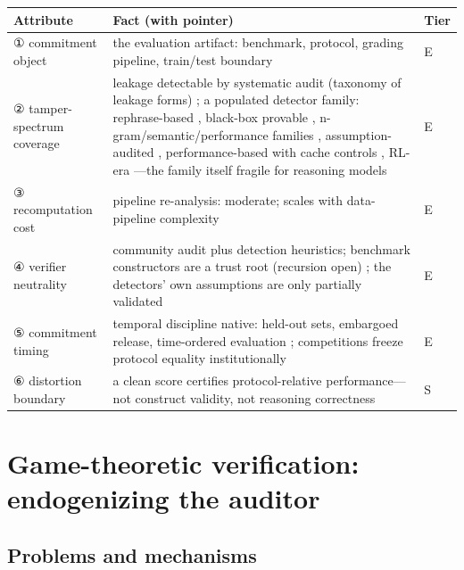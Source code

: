 \documentclass[11pt,a4paper]{article}
\begin{document}
\begin{table}[htbp]
\centering
\footnotesize
\setlength{\tabcolsep}{3.5pt}
\renewcommand{\arraystretch}{1.18}
\begin{tabularx}{0.985\textwidth}{>{\raggedright\arraybackslash}p{} >{\raggedright\arraybackslash}X >{\raggedright\arraybackslash}p{}}
\toprule
\textbf{Attribute} & \textbf{Fact (with pointer)} & \textbf{Tier} \\
\midrule
① commitment object & the evaluation artifact: benchmark, protocol, grading pipeline, train\slash test boundary \cite{key07,key08} & E \\
② tamper-spectrum coverage & leakage detectable by systematic audit (taxonomy of leakage forms) \cite{key07}; a populated detector family: rephrase-based \cite{key36}, black-box provable \cite{key37}, n-gram\slash semantic\slash performance families \cite{key38}, assumption-audited \cite{key39}, performance-based with cache controls \cite{key40}, RL-era \cite{key41}—the family itself fragile for reasoning models \cite{key42} & E \\
③ recomputation cost & pipeline re-analysis: moderate; scales with data-pipeline complexity \cite{key07} & E \\
④ verifier neutrality & community audit plus detection heuristics; benchmark constructors are a trust root (recursion open) \cite{key07,key08}; the detectors' own assumptions are only partially validated \cite{key39} & E \\
⑤ commitment timing & temporal discipline native: held-out sets, embargoed release, time-ordered evaluation \cite{key07,key08}; competitions freeze protocol equality institutionally \cite{key35} & E \\
⑥ distortion boundary & a clean score certifies protocol-relative performance—not construct validity, not reasoning correctness & S \\
\bottomrule
\end{tabularx}
\end{table}

\section{Game-theoretic verification: endogenizing the auditor}

\subsection{Problems and mechanisms}
\end{document}
